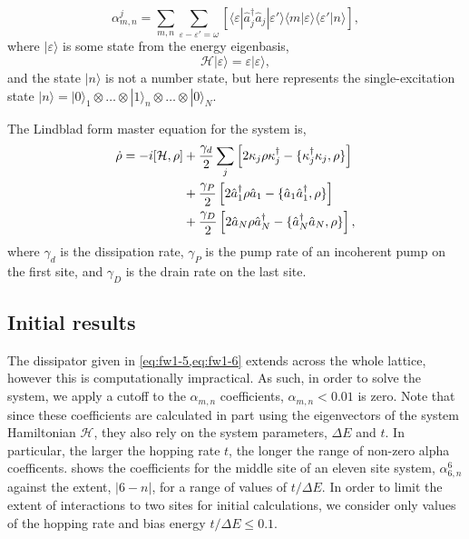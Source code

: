 \begin{equation}
	\alpha_{m,n}^{j} = \sum_{m,n} \sum_{\varepsilon - \varepsilon' = \omega} \left[ \langle \varepsilon | \hat{a}_{j}^{\dagger}\hat{a}_{j} | \varepsilon' \rangle \langle m |\varepsilon \rangle \langle \varepsilon' | n \rangle \right], 
	\label{eq:fw1-6}
\end{equation}
where \(|\varepsilon \rangle\) is some state from the energy eigenbasis,
\begin{equation}
	\mathcal{H}|\varepsilon \rangle = \varepsilon|\varepsilon\rangle,
	\label{eq:fw1-7}
\end{equation}
and the state \(|n\rangle\) is not a number state, but here represents the single-excitation state \(|n \rangle = | 0 \rangle_{1} \otimes \ldots \otimes | 1 \rangle_{n} \otimes \ldots \otimes |0 \rangle_{N}\). 

The Lindblad form master equation for the system is, 
\begin{align}
	\dot{\rho} = -i[\mathcal{H}, \rho] &+ \frac{\gamma_{d}}{2} \sum_{j} \left[2\kappa_{j}\rho\kappa_{j}^{\dagger} - \{\kappa_{j}^{\dagger}\kappa_{j}, \rho\}\right] \notag \\
	&+ \frac{\gamma_{P}}{2}\left[2\hat{a}_{1}^{\dagger}\rho\hat{a}_{1} - \{\hat{a}_{1}\hat{a}_{1}^{\dagger}, \rho\}\right] \notag \\
	&+ \frac{\gamma_{D}}{2}\left[2\hat{a}_{N}\rho\hat{a}_{N}^{\dagger} - \{\hat{a}_{N}^{\dagger}\hat{a}_{N}, \rho\}\right],
	\label{eq:fw1-2}
\end{align}
where \(\gamma_{d}\) is the dissipation rate, \(\gamma_{P}\) is the pump rate of an incoherent pump on the first site, and \(\gamma_{D}\) is the drain rate on the last site. 

\subsection{Initial results}
The dissipator given in \cref{eq:fw1-5,eq:fw1-6} extends across the whole lattice, however this is computationally impractical. As such, in order to solve the system, we apply a cutoff to the \(\alpha_{m,n}\) coefficients, \(\alpha_{m,n} < 0.01\) is zero. Note that since these coefficients are calculated in part using the eigenvectors of the system Hamiltonian \(\mathcal{H}\), they also rely on the system parameters, \(\Delta E\) and \(t\). In particular, the larger the hopping rate \(t\), the longer the range of non-zero alpha coefficents.  shows the coefficients for the middle site of an eleven site system, \(\alpha_{6,n}^{6}\) against the extent, \(|6-n|\), for a range of values of \( t / \Delta E\). In order to limit the extent of interactions to two sites for initial calculations, we consider only values of the hopping rate and bias energy \(t / \Delta E \leq 0.1\). 

